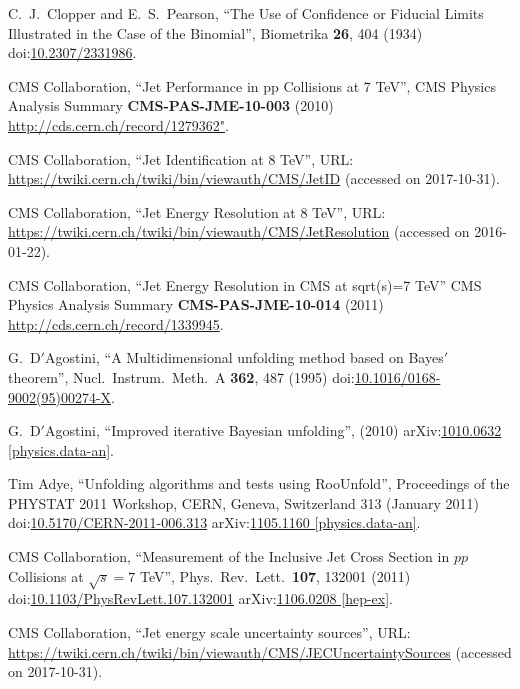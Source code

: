 \begin{thebibliography}{99}
C.~J.~Clopper and E.~S.~Pearson, ``The Use of Confidence or Fiducial Limits Illustrated in the Case of the Binomial'', Biometrika {\bf 26}, 404 (1934) doi:\href{http://www.jstor.org/stable/2331986}{10.2307/2331986}.

CMS Collaboration, ``Jet Performance in pp Collisions at 7 TeV'', CMS Physics Analysis Summary {\bf CMS-PAS-JME-10-003} (2010) \url{http://cds.cern.ch/record/1279362"}.

CMS Collaboration, ``Jet Identification at 8 TeV'', URL: \url{https://twiki.cern.ch/twiki/bin/viewauth/CMS/JetID} (accessed on 2017-10-31).

CMS Collaboration, ``Jet Energy Resolution at 8 TeV'', URL: \url{https://twiki.cern.ch/twiki/bin/viewauth/CMS/JetResolution} (accessed on 2016-01-22).

CMS Collaboration, ``Jet Energy Resolution in CMS at sqrt(s)=7 TeV'' CMS Physics Analysis Summary {\bf CMS-PAS-JME-10-014} (2011) \url {http://cds.cern.ch/record/1339945}.

G.~D$'$Agostini, ``A Multidimensional unfolding method based on Bayes$'$ theorem'', Nucl.\ Instrum.\ Meth.\ A {\bf 362}, 487 (1995) doi:\href{http://dx.doi.org/10.1016/0168-9002(95)00274-X}{10.1016/0168-9002(95)00274-X}.

G.~D$'$Agostini, ``Improved iterative Bayesian unfolding'', (2010) arXiv:\href{https://arxiv.org/abs/1010.0632}{1010.0632 [physics.data-an]}.

Tim Adye, ``Unfolding algorithms and tests using RooUnfold'', Proceedings of the PHYSTAT 2011 Workshop, CERN, Geneva, Switzerland 313 (January 2011) doi:\href{http://dx.doi.org/10.5170/CERN-2011-006.313}{10.5170/CERN-2011-006.313} arXiv:\href{https://arxiv.org/abs/1105.1160}{1105.1160 [physics.data-an]}.

CMS Collaboration, ``Measurement of the Inclusive Jet Cross Section in $pp$ Collisions at $\sqrt{s}=7$ TeV'', Phys.\ Rev.\ Lett.\ {\bf 107}, 132001 (2011) doi:\href{https://doi.org/10.1103/PhysRevLett.107.132001}{10.1103/PhysRevLett.107.132001} arXiv:\href{https://arxiv.org/abs/1106.0208}{1106.0208 [hep-ex]}.

CMS Collaboration, ``Jet energy scale uncertainty sources'', URL: \url{https://twiki.cern.ch/twiki/bin/viewauth/CMS/JECUncertaintySources} (accessed on 2017-10-31).


\end{thebibliography}
